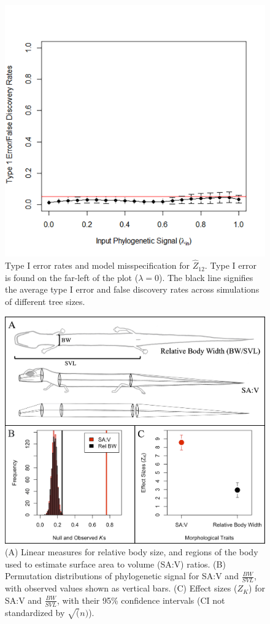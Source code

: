 \documentclass[
]{article}
\begin{document}
\begin{figure}
\includegraphics[width=24.22in,height=0.75\textheight]{Figs/fig.4} \caption{Type I error rates and model misspecification for $\hat{Z}_{12}$. Type I error is found on the far-left of the plot ($\lambda = 0$). The black line signifies the average type I error and false discovery rates across simulations of different tree sizes.}\label{fig:unnamed-chunk-6}
\end{figure}

\begin{figure}
\includegraphics[width=0.9\linewidth]{Figs/fig.5} \caption{(A) Linear measures for relative body size, and regions of the body used to estimate surface area to volume (SA:V) ratios. (B) Permutation distributions of phylogenetic signal for SA:V and $\frac{BW}{SVL}$, with observed values shown as vertical bars. (C) Effect sizes ($Z_K$) for SA:V and $\frac{BW}{SVL}$, with their 95\% confidence intervals (CI not standardized by $\sqrt(n)$).}\label{fig:unnamed-chunk-7}
\end{figure}
\end{document}
